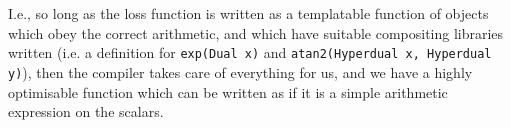 I.e., so long as the loss function is written as a templatable function of objects which obey the correct arithmetic, and which have suitable compositing libraries written (i.e. a definition for \verb|exp(Dual x)| and \verb|atan2(Hyperdual x, Hyperdual y)|), then the compiler takes care of everything for us, and we have a highly optimisable function which can be written as if it is a simple arithmetic expression on the scalars.
